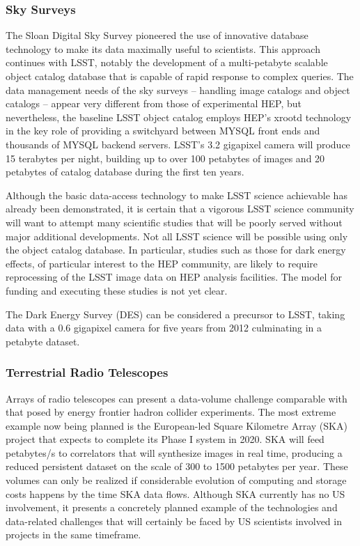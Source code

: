 \subsubsection{Sky Surveys}
The Sloan Digital Sky Survey pioneered the use of innovative database technology to make 
its data maximally useful to scientists.  This approach continues with LSST, notably the 
development of a multi-petabyte scalable object catalog database that is capable of rapid 
response to complex queries.  The data management needs of the sky surveys -- handling image 
catalogs and object catalogs -- appear very different from those of experimental HEP, but 
nevertheless, the baseline LSST object catalog employs HEP’s xrootd technology in the key 
role of providing a switchyard between MYSQL front ends and thousands of MYSQL backend servers.  
LSST’s 3.2 gigapixel camera will produce 15 terabytes per night, building up to over 100 
petabytes of images and 20 petabytes of catalog database during the first ten years.

Although the basic data-access technology to make LSST science achievable has already been 
demonstrated, it is certain that a vigorous LSST science community will want to attempt many 
scientific studies that will be poorly served without major additional developments.  
Not all LSST science will be possible using only the object catalog database. In particular, 
studies such as those for dark energy effects, of particular interest to the HEP community, 
are likely to require reprocessing of the LSST image data on HEP analysis facilities.  
The model for funding and executing these studies is not yet clear.

The Dark Energy Survey (DES) can be considered a precursor to LSST, taking data with a 
0.6 gigapixel camera for five years from 2012 culminating in a petabyte dataset.

\subsubsection{Terrestrial Radio Telescopes}
Arrays of radio telescopes can present a data-volume challenge comparable with that 
posed by energy frontier hadron collider experiments.  The most extreme example now being 
planned is the European-led Square Kilometre Array (SKA) project that expects to complete 
its Phase I system in 2020. SKA will feed petabytes/s to correlators that will synthesize 
images in real time, producing a reduced persistent dataset on the scale of 300 to 1500 
petabytes per year.  These volumes can only be realized if considerable evolution of 
computing and storage costs happens by the time SKA data flows.  Although SKA currently 
has no US involvement, it presents a concretely planned example of the technologies and 
data-related challenges that will certainly be faced by US scientists involved in projects 
in the same timeframe.

